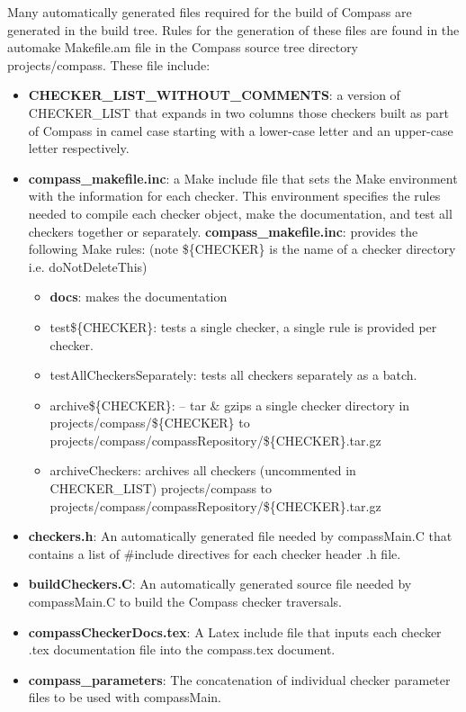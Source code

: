 Many automatically generated files required for the build of Compass are 
generated in the build tree. Rules for the generation of these files are found
in the automake Makefile.am file in the Compass source tree directory 
projects/compass. These file include:

\begin{itemize}
\item {\bf CHECKER\_LIST\_WITHOUT\_COMMENTS}: a version of CHECKER\_LIST
	that expands in two columns those checkers built as part of Compass
	in camel case starting with a lower-case letter and an upper-case
	letter respectively.
\item {\bf compass\_makefile.inc}: a Make include file that sets the Make environment
	with the information for each checker. This environment specifies
	the rules needed to compile each checker object, make the
	documentation, and test all checkers together or separately.
   {\bf compass\_makefile.inc}: provides the following Make rules: 
	(note \$\{CHECKER\} is the name of a checker directory i.e. 
	doNotDeleteThis)
   \begin{itemize}
      \item {\bf docs}:  makes the documentation

      \item test\$\{CHECKER\}: tests a single checker, a single rule is provided
		      per checker.

      \item testAllCheckersSeparately: tests all checkers separately as a batch.

      \item archive\$\{CHECKER\}: -- tar \& gzips a single checker directory in 
		projects/compass/\$\{CHECKER\} to 
		projects/compass/compassRepository/\$\{CHECKER\}.tar.gz

      \item archiveCheckers: archives all checkers (uncommented in CHECKER\_LIST)
                projects/compass to
                projects/compass/compassRepository/\$\{CHECKER\}.tar.gz
   \end{itemize}

\item {\bf checkers.h}: An automatically generated file needed by compassMain.C that 
	contains a list of \#include directives for each checker header .h file.

\item {\bf buildCheckers.C}: An automatically generated source file needed by 
	compassMain.C to build the Compass checker traversals.

\item {\bf compassCheckerDocs.tex}: A Latex include file that inputs each checker .tex
	documentation file into the compass.tex document.

\item {\bf compass\_parameters}: The concatenation of individual checker parameter files
	to be used with compassMain.

\end{itemize}




